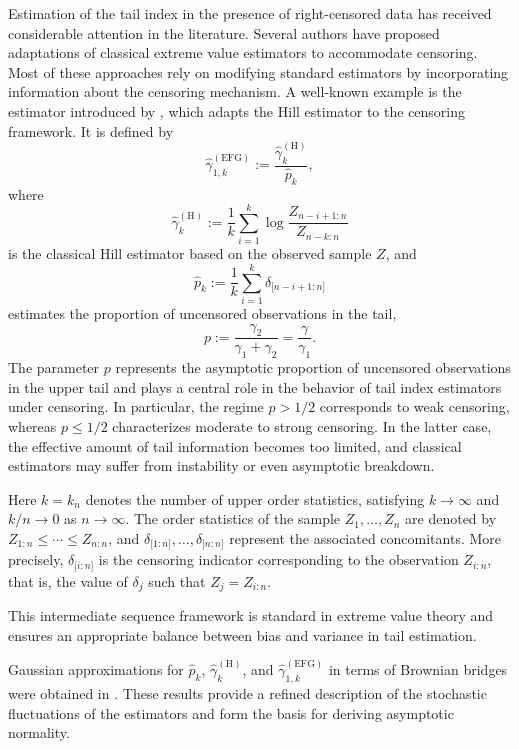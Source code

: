 \documentclass[reqno,openbib,runningheads,a4paper,12pt]{amsart}%
\begin{document}
\noindent Estimation of the tail index in the presence of right-censored data
has received considerable attention in the literature. Several authors have
proposed adaptations of classical extreme value estimators to accommodate
censoring. Most of these approaches rely on modifying standard estimators by
incorporating information about the censoring mechanism. A well-known example
is the estimator introduced by \cite{EnFG08}, which adapts the Hill estimator
\citep{Hill75} to the censoring framework. It is defined by
\[
\widehat{\gamma}_{1,k}^{(\mathrm{EFG})}:=\frac{\widehat{\gamma}_{k}%
^{(\mathrm{H})}}{\widehat{p}_{k}},
\]
where
\[
\widehat{\gamma}_{k}^{(\mathrm{H})}:=\frac{1}{k}\sum_{i=1}^{k}\log
\frac{Z_{n-i+1:n}}{Z_{n-k:n}}%
\]
is the classical Hill estimator based on the observed sample $Z$, and
\[
\widehat{p}_{k}:=\frac{1}{k}\sum_{i=1}^{k}\delta_{\lbrack n-i+1:n]}%
\]
estimates the proportion of uncensored observations in the tail,
\[
p:=\frac{\gamma_{2}}{\gamma_{1}+\gamma_{2}}=\frac{\gamma}{\gamma_{1}}.
\]
The parameter $p$ represents the asymptotic proportion of uncensored
observations in the upper tail and plays a central role in the behavior of
tail index estimators under censoring. In particular, the regime $p>1/2$
corresponds to weak censoring, whereas $p\leq1/2$ characterizes moderate to
strong censoring. In the latter case, the effective amount of tail information
becomes too limited, and classical estimators may suffer from instability or
even asymptotic breakdown.\smallskip

\noindent Here $k=k_{n}$ denotes the number of upper order statistics,
satisfying $k\rightarrow\infty$ and $k/n\rightarrow0$ as $n\rightarrow\infty$.
The order statistics of the sample $Z_{1},\ldots,Z_{n}$ are denoted by
$Z_{1:n}\leq\cdots\leq Z_{n:n}$, and $\delta_{\lbrack1:n]},\ldots
,\delta_{\lbrack n:n]}$ represent the associated concomitants. More precisely,
$\delta_{\lbrack i:n]}$ is the censoring indicator corresponding to the
observation $Z_{i:n}$, that is, the value of $\delta_{j}$ such that
$Z_{j}=Z_{i:n}$.\smallskip

\noindent This intermediate sequence framework is standard in extreme value
theory and ensures an appropriate balance between bias and variance in tail
estimation.\smallskip

\noindent Gaussian approximations for $\widehat{p}_{k}$, $\widehat{\gamma}%
_{k}^{(\mathrm{H})}$, and $\widehat{\gamma}_{1,k}^{(\mathrm{EFG})}$ in terms
of Brownian bridges were obtained in \cite{BMN-2015}. These results provide a
refined description of the stochastic fluctuations of the estimators and form
the basis for deriving asymptotic normality.\smallskip
\end{document}
